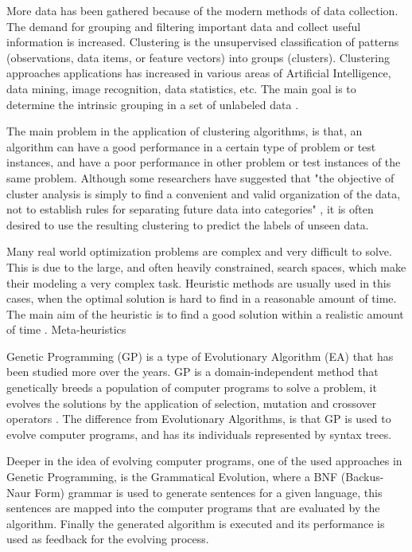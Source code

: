 \documentclass[journal]{IEEEtran}
\begin{document}
More data has been gathered because of the modern methods of data collection. The demand for grouping and filtering important data and collect useful information is increased. Clustering is the unsupervised classification of patterns (observations, data items, or feature vectors) into groups (clusters). Clustering approaches applications has increased in various areas of Artificial Intelligence, data mining, image recognition, data statistics, etc. The main goal is to determine the intrinsic grouping in a set of unlabeled data \cite{ahalya2015data}.

The main problem in the application of clustering algorithms, is that, an algorithm can have a good performance in a certain type of problem or test instances, and have a poor performance in other problem or test instances of the same problem. Although some researchers have suggested that "the objective of cluster analysis is simply to find a convenient and valid organization of the data, not to establish rules for separating future data into categories" \cite{jain1988algorithms}, it is often desired to use the resulting clustering to predict the labels of unseen data.

Many real world optimization problems are complex and very difficult to solve. This is due to the large, and often heavily constrained, search spaces, which make their modeling a very complex task. Heuristic methods are usually used in this cases, when the optimal solution is hard to find in a reasonable amount of time. The main aim of the heuristic is to find a good solution within a realistic amount of time \cite{sabar2013grammatical}. Meta-heuristics

Genetic Programming (GP) is a type of Evolutionary Algorithm (EA) that has been studied more over the years. GP is a domain-independent method that genetically breeds a population of computer programs to solve a problem, it evolves the solutions by the application of selection, mutation and crossover operators \cite{poli2014genetic}. The difference from Evolutionary Algorithms, is that GP is used to evolve computer programs, and has its individuals represented by syntax trees.

Deeper in the idea of evolving computer programs, one of the used approaches in Genetic Programming, is the Grammatical Evolution, where a BNF (Backus-Naur Form) grammar is used to generate sentences for a given language, this sentences are mapped into the computer programs that are evaluated by the algorithm. Finally the generated algorithm is executed and its performance is used as feedback for the evolving process.
\end{document}
